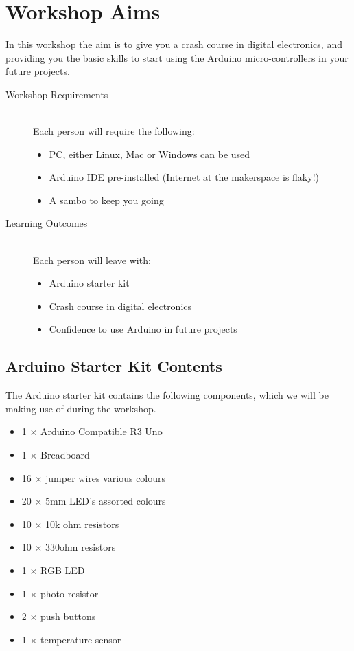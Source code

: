 \newpage
\section*{Workshop Aims}
In this workshop the aim is to give you a crash course in digital electronics, and providing you the basic skills to start using the Arduino micro-controllers in your future projects.

\begin{description}
	\item[Workshop Requirements] \hfill \\
	Each person will require the following:
	\begin{itemize}
		\item PC, either Linux, Mac or Windows can be used
		\item Arduino IDE pre-installed (Internet at the makerspace is flaky!)
		\item A sambo to keep you going
	\end{itemize}
	
	\item[Learning Outcomes] \hfill \\
	Each person will leave with:
	\begin{itemize}
		\item Arduino starter kit
		\item Crash course in digital electronics
		\item Confidence to use Arduino in future projects
	\end{itemize}
\end{description}

\subsection*{Arduino Starter Kit Contents}
The Arduino starter kit contains the following components, which we will be making use of during the workshop.

\begin{itemize}
	\item 1 $\times$ Arduino Compatible R3 Uno
	\item 1 $\times$ Breadboard
	\item 16 $\times$ jumper wires various colours
	\item 20 $\times$ 5mm LED's assorted colours
	\item 10 $\times$ 10k ohm resistors
	\item 10 $\times$ 330ohm resistors
	\item 1 $\times$ RGB LED
	\item 1 $\times$ photo resistor
	\item 2 $\times$ push buttons
	\item 1 $\times$ temperature sensor
	
\end{itemize}


